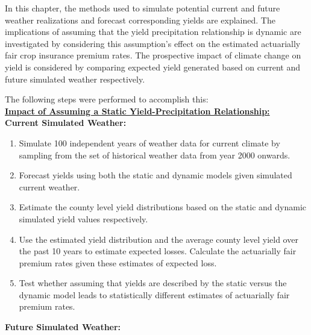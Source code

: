 In this chapter, the methods used to simulate potential current and future weather realizations and forecast corresponding yields are explained. The implications of assuming that the yield precipitation relationship is dynamic are investigated by considering this assumption’s effect on the estimated actuarially fair crop insurance premium rates. The prospective impact of climate change on yield is considered by comparing expected yield generated based on current and future simulated weather respectively.

The following steps were performed to accomplish this:
\noindent
\\
\textbf{\underline{ Impact of Assuming a Static Yield-Precipitation Relationship:}}
\\
\textbf{ Current Simulated Weather:}

\begin{enumerate}
    \item Simulate 100 independent years of weather data for current climate by sampling from the set of historical weather data from year 2000 onwards.
    \item Forecast yields using both the static and dynamic models given simulated current weather.
    \item Estimate the county level yield distributions based on the static and dynamic simulated yield values respectively.
    \item Use the estimated yield distribution and the average county level yield over the past 10 years to estimate expected losses. Calculate the actuarially fair premium rates given these estimates of expected loss.
    \item Test whether assuming that yields are described by the static versus the dynamic model leads to statistically different estimates of actuarially fair premium rates.
    \end{enumerate}
\noindent
\textbf{ Future Simulated Weather:} 
